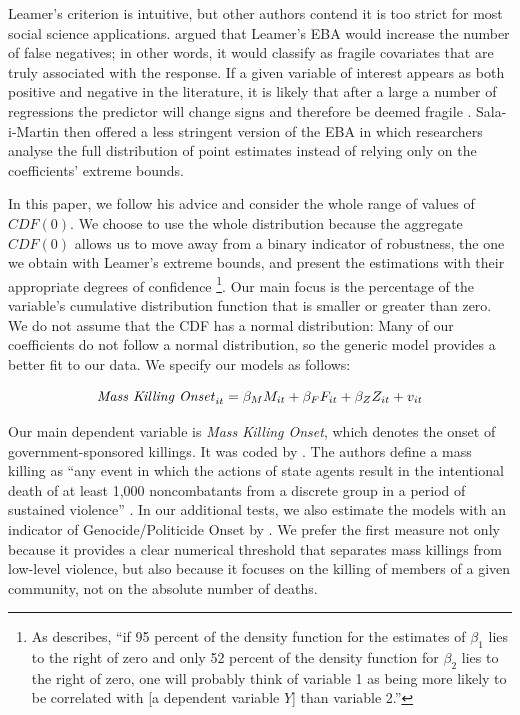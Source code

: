 Leamer's criterion is intuitive, but other authors contend it is too strict for most social science applications. \cite{sala1997just} argued that Leamer's EBA would increase the number of false negatives; in other words, it would classify as fragile covariates that are truly associated with the response. If a given variable of interest appears as both positive and negative in the literature, it is likely that after a large a number of regressions the predictor will change signs and therefore be deemed fragile \citep[179]{sala1997just}. Sala-i-Martin then offered a less stringent version of the EBA in which researchers analyse the full distribution of point estimates instead of relying only on the coefficients' extreme bounds. 

In this paper, we follow his advice and consider the whole range of values of $CDF(0)$. We choose to use the whole distribution because the aggregate $CDF(0)$ allows us to move away from a binary indicator of robustness, the one we obtain with Leamer's extreme bounds, and present the estimations with their appropriate degrees of confidence \citep[179]{sala1997just}\footnote{As \citet[179]{sala1997just} describes, ``if 95 percent of the density function for the estimates of $\beta_{1}$ lies to the right of zero and only 52 percent of the density function for $\beta_{2}$  lies to the right of zero, one will probably think of variable 1 as being more likely to be correlated with [a dependent variable $Y$] than variable 2.''}. Our main focus is the percentage of the variable's cumulative distribution function that is smaller or greater than zero. We do not assume that the CDF has a normal distribution: Many of our coefficients do not follow a normal distribution, so the generic model provides a better fit to our data. We specify our models as follows:

\begin{equation}
\text{\textit{Mass Killing Onset}}_{it} = \beta_{M}M_{it} + \beta_{F}F_{it} + \beta_{Z}Z_{it} + v_{it}
\end{equation}

Our main dependent variable is \textit{Mass Killing Onset}, which denotes the onset of government-sponsored killings. It was coded by \cite{ulfelder2008assessing}. The authors define a mass killing as ``any event in which the actions of state agents result in the intentional death of at least 1,000 noncombatants from a discrete group in a period of sustained violence'' \citep[2]{ulfelder2008assessing}. In our additional tests, we also estimate the models with an indicator of Genocide/Politicide Onset by \cite{harff2003no}. We prefer the first measure not only because it provides a clear numerical threshold that separates mass killings from low-level violence, but also because it focuses on the killing of members of a given community, not on the absolute number of deaths. 

